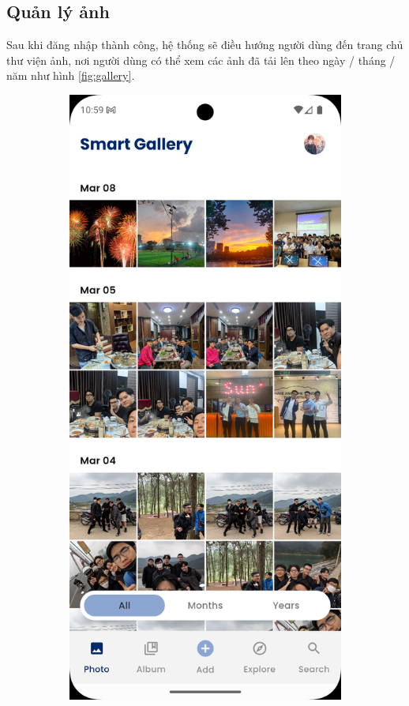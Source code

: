 \subsection{Quản lý ảnh}

Sau khi đăng nhập thành công, hệ thống sẽ điều hướng người dùng đến trang chủ thư viện ảnh, nơi người dùng có thể xem các ảnh đã tải lên theo ngày / tháng / năm như hình \ref{fig:gallery}.

\begin{figure}[H]
    \centering
    \begin{subfigure}{0.48\textwidth}
        \includegraphics[width=1\linewidth]{figures/c4/4-2/gallery_1.png} 

\end{subfigure}
\end{figure}
